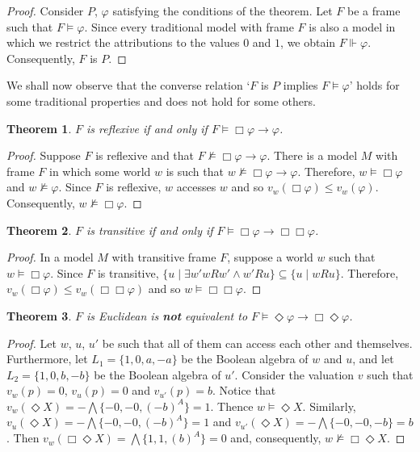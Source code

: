 \documentclass{amsart}
\newtheorem{theorem}{Theorem}[section]
\newcommand{\so}{\rightarrow}
\begin{document}
\begin{proof}
    Consider $P$, $\varphi$ satisfying the conditions of the theorem. Let $F$ be a frame such that $F \vDash \varphi$. Since every traditional model with frame $F$ is also a model in which we restrict the attributions to the values $0$ and $1$, we obtain $F \Vdash \varphi$. Consequently, $F$ is $P$.
\end{proof}

We shall now observe that the converse relation `$F$ is $P$ implies $F \vDash \varphi$' holds for some traditional properties and does not hold for some others.

\begin{theorem}
    $F$ is reflexive if and only if $F \vDash \Box \varphi \so \varphi$.
\end{theorem}

\begin{proof}
    Suppose $F$ is reflexive and that $F \nvDash \Box \varphi \so \varphi$. There is a model $M$ with frame $F$ in which some world $w$ is such that $w \nvDash \Box \varphi \so \varphi$. Therefore, $w \vDash \Box \varphi$ and $w \nvDash \varphi$. Since $F$ is reflexive, $w$ accesses $w$ and so $v_w(\Box \varphi) \leq v_w(\varphi)$. Consequently, $w \nvDash \Box \varphi$.
\end{proof}

\begin{theorem}
    $F$ is transitive if and only if $F \vDash \Box \varphi \so \Box \Box \varphi$.
\end{theorem}

\begin{proof}
    In a model $M$ with transitive frame $F$, suppose a world $w$ such that $w \vDash \Box \varphi$. Since $F$ is transitive, $\{u \mid \exists w' w R w' \land w' R u\} \subseteq \{u \mid w R u\}$. Therefore, $v_w(\Box \varphi) \leq v_w(\Box \Box \varphi)$ and so $w \vDash \Box \Box \varphi$. 
\end{proof}

\begin{theorem}\label{Euc_no}
    $F$ is Euclidean is \textbf{not} equivalent to $F \vDash \Diamond \varphi \so \Box \Diamond \varphi$.
\end{theorem}

\begin{proof}
    Let $w$, $u$, $u'$ be such that all of them can access each other and themselves. Furthermore, let $L_1 = \{1, 0, a, -a\}$ be the Boolean algebra of $w$ and $u$, and let $L_2 = \{1, 0, b, -b\}$ be the Boolean algebra of $u'$. Consider the valuation $v$ such that $v_w(p) = 0$, $v_u(p) = 0$ and $v_{u'}(p) = b$. Notice that $v_w(\Diamond X) = - \bigwedge \{-0, -0, (-b)^A\} = 1$. Thence $w \vDash \Diamond X$. Similarly, $v_u(\Diamond X) = - \bigwedge \{-0, -0, (-b)^A\} = 1$ and $v_{u'}(\Diamond X) = - \bigwedge \{-0, -0, -b\} = b$. Then $v_w(\Box \Diamond X) = \bigwedge \{1, 1, (b)^A\} = 0$ and, consequently, $w \nvDash \Box \Diamond X$.   
\end{proof}
\end{document}
